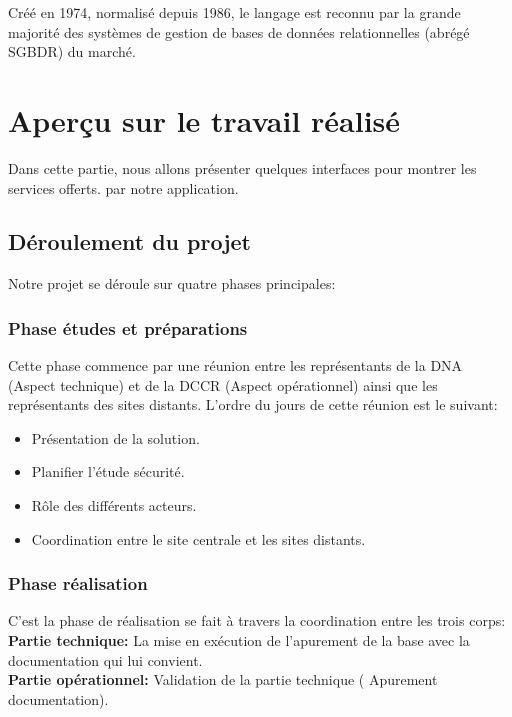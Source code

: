 \begin{description}
Créé en 1974, normalisé depuis 1986, le langage est reconnu par la grande majorité des systèmes de gestion de bases de données relationnelles (abrégé SGBDR) du marché.
\end{description}



\section{Aperçu sur le travail réalisé}
Dans cette partie, nous allons présenter quelques interfaces pour montrer les services offerts.
par notre application.
\subsection{Déroulement du projet}
Notre projet se déroule sur quatre phases principales:
\subsubsection{Phase études et préparations}
Cette phase commence par une réunion entre les représentants de la DNA (Aspect technique) et de la DCCR (Aspect opérationnel) ainsi que les représentants des sites distants. L'ordre du jours de cette réunion est le suivant:\\
\begin{itemize}
\item Présentation de la solution.\\
\item Planifier l'étude sécurité.\\
\item Rôle des différents acteurs. \\
\item Coordination entre le site centrale et les sites distants.\\
\end{itemize}
\subsubsection{Phase réalisation}
C'est la phase de réalisation se fait à travers la coordination entre les trois corps:\\

\textbf{Partie technique:} La mise en exécution de l'apurement de la base avec la documentation qui lui convient.\\

\textbf{Partie opérationnel:} Validation de la partie technique ( Apurement documentation).\\

